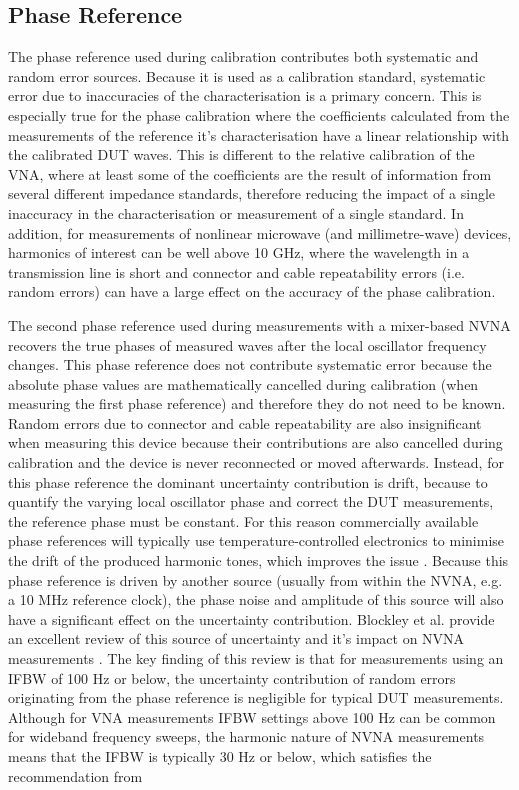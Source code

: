 \documentclass[../thesis/thesis.tex]{subfiles}
\begin{document}
\begin{refsection}
\subsection{Phase Reference}

The phase reference used during calibration contributes both systematic and random error sources. Because it is used as a calibration standard, systematic error due to inaccuracies of the characterisation is a primary concern. This is especially true for the phase calibration where the coefficients calculated from the measurements of the reference it's characterisation have a linear relationship with the calibrated DUT waves. This is different to the relative calibration of the VNA, where at least some of the coefficients are the result of information from several different impedance standards, therefore reducing the impact of a single inaccuracy in the characterisation or measurement of a single standard. In addition, for measurements of nonlinear microwave (and millimetre-wave) devices, harmonics of interest can be well above 10 GHz, where the wavelength in a transmission line is short and connector and cable repeatability errors (i.e. random errors) can have a large effect on the accuracy of the phase calibration.

The second phase reference used during measurements with a mixer-based NVNA recovers the true phases of measured waves after the local oscillator frequency changes. This phase reference does not contribute systematic error because the absolute phase values are mathematically cancelled during calibration (when measuring the first phase reference) and therefore they do not need to be known. Random errors due to connector and cable repeatability are also insignificant when measuring this device because their contributions are also cancelled during calibration and the device is never reconnected or moved afterwards. Instead, for this phase reference the dominant uncertainty contribution is drift, because to quantify the varying local oscillator phase and correct the DUT measurements, the reference phase must be constant. For this reason commercially available phase references will typically use temperature-controlled electronics to minimise the drift of the produced harmonic tones, which improves the issue \cite{Jargon_2003}. Because this phase reference is driven by another source (usually from within the NVNA, e.g. a 10 MHz reference clock), the phase noise and amplitude of this source will also have a significant effect on the uncertainty contribution. Blockley et al. provide an excellent review of this source of uncertainty and it's impact on NVNA measurements \cite{Blockley_2007}. The key finding of this review is that for measurements using an IFBW of 100 Hz or below, the uncertainty contribution of random errors originating from the phase reference is negligible for typical DUT measurements. Although for VNA measurements IFBW settings above 100 Hz can be common for wideband frequency sweeps, the harmonic nature of NVNA measurements means that the IFBW is typically 30 Hz or below, which satisfies the recommendation from \cite{Blockley_2007}


\end{refsection}
\end{document}
